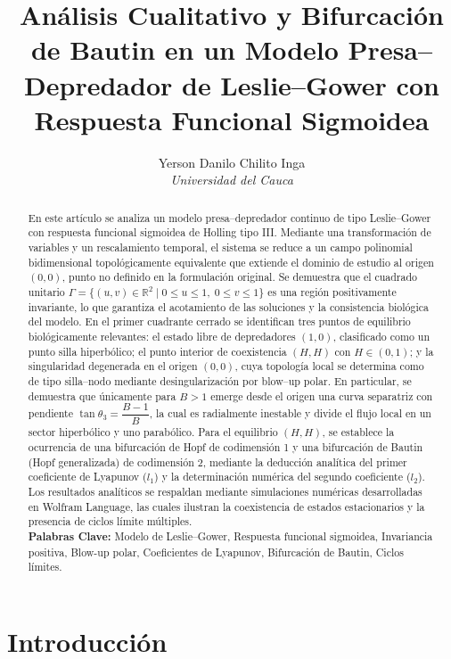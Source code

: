 \documentclass[]{article}
\title{Análisis Cualitativo y Bifurcación de Bautin en un Modelo Presa--Depredador de Leslie--Gower con Respuesta Funcional Sigmoidea}
\author{Yerson Danilo Chilito Inga \\ \textit{Universidad del Cauca}}
\theoremstyle{remark}
\begin{document}
	
	\maketitle
	
	\begin{abstract}
    En este artículo se analiza un modelo presa--depredador continuo de tipo Leslie--Gower con respuesta funcional sigmoidea de Holling tipo III. Mediante una transformación de variables y un rescalamiento temporal, el sistema se reduce a un campo polinomial bidimensional topológicamente equivalente que extiende el dominio de estudio al origen $(0,0)$, punto no definido en la formulación original. Se demuestra que el cuadrado unitario $\Gamma = \{ (u, v) \in \mathbb{R}^{2} \; | \; 0 \leq u \leq 1, \; 0 \leq v \leq 1 \}$ es una región positivamente invariante, lo que garantiza el acotamiento de las soluciones y la consistencia biológica del modelo. En el primer cuadrante cerrado se identifican tres puntos de equilibrio biológicamente relevantes: el estado libre de depredadores $(1,0)$, clasificado como un punto silla hiperbólico; el punto interior de coexistencia $(H,H)$ con $H \in (0,1)$; y la singularidad degenerada en el origen $(0,0)$, cuya topología local se determina como de tipo silla--nodo mediante desingularización por blow--up polar. En particular, se demuestra que únicamente para $B > 1$ emerge desde el origen una curva separatriz con pendiente $\tan \theta_3 = \dfrac{B-1}{B}$, la cual es radialmente inestable y divide el flujo local en un sector hiperbólico y uno parabólico. Para el equilibrio $(H,H)$, se establece la ocurrencia de una bifurcación de Hopf de codimensión 1 y una bifurcación de Bautin (Hopf generalizada) de codimensión 2, mediante la deducción analítica del primer coeficiente de Lyapunov ($l_1$) y la determinación numérica del segundo coeficiente ($l_2$). Los resultados analíticos se respaldan mediante simulaciones numéricas desarrolladas en Wolfram Language, las cuales ilustran la coexistencia de estados estacionarios y la presencia de ciclos límite múltiples. \\
    
    \noindent \textbf{Palabras Clave:} Modelo de Leslie--Gower, Respuesta funcional sigmoidea, Invariancia positiva, Blow-up polar, Coeficientes de Lyapunov, Bifurcación de Bautin, Ciclos límites.
	\end{abstract}
	
	\section{Introducción}
	
\end{document}
